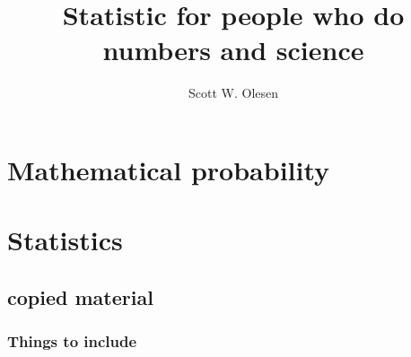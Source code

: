 \documentclass{book}
\title{Statistic for people who do numbers and science}
\author{Scott W. Olesen}
\begin{document}
\maketitle

\frontmatter



\mainmatter



\part{Mathematical probability}




\part{Statistics}





\chapter{copied material}

\section{Things to include}\label{things-to-include}
\end{document}
